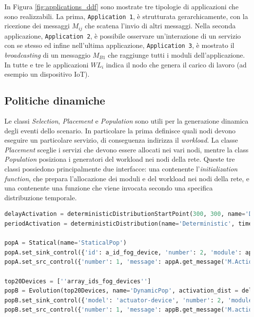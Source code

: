 In Figura \ref{fig:applications_ddf} sono mostrate tre tipologie di applicazioni che sono realizzabili. La prima, \texttt{Application 1}, è strutturata gerarchicamente, con la ricezione dei messaggi $M_{ij}$ che scatena l'invio di altri messaggi. Nella seconda applicazione, \texttt{Application 2}, è possibile osservare un'interazione di un servizio con se stesso ed infine nell'ultima applicazione, \texttt{Application 3}, è mostrato il \textit{broadcasting} di un messaggio $M_{B1}$ che raggiunge tutti i moduli dell'applicazione. In tutte e tre le applicazioni $WL_i$ indica il nodo che genera il carico di lavoro (ad esempio un dispositivo IoT).

\subsection{Politiche dinamiche}
Le classi \textit{Selection}, \textit{Placement} e \textit{Population} sono utili per la generazione dinamica degli eventi dello scenario. In particolare la prima definisce quali nodi devono eseguire un particolare servizio, di conseguenza indirizza il \textit{workload}. La classe \textit{Placement} sceglie i servizi che devono essere allocati nei vari nodi, mentre la class \textit{Population} posiziona i generatori del workload nei nodi della rete. Queste tre classi possiedono principalmente due interfacce: una contenente l'\textit{initialization function}, che prepara l'allocazione dei moduli e del workload nei nodi della rete, e una contenente una funzione che viene invocata secondo una specifica distribuzione temporale.

\begin{lstlisting}[language=python, caption={Definizione di due Population policies: una statica (\texttt{popA}) ed una dinamica (\texttt{popB}). \cite{YAFSSimulator}}, captionpos=b, label={lst:population-policy}]
delayActivation = deterministicDistributionStartPoint(300, 300, name='Deterministic')
periodActivation = deterministicDistribution(name='Deterministic', time=100)

popA = Statical(name='StaticalPop')
popA.set_sink_control({'id': a_id_fog_device, 'number': 2, 'module': appA.get_sink_modules()})
popA.set_src_control({'number': 1, 'message': appA.get_message('M.Action'), 'distribution': periodicActivation})

top20Devices = [''array_ids_fog_devices'']
popB = Evolution(top20Devices, name='DynamicPop', activation_dist = delayActivation)
popB.set_sink_control({'model': 'actuator-device', 'number': 2, 'module': appB.get_sink_control()})
popB.set_src_control({'number': 1, 'message': appB.get_message('M.action'), 'distribution': periodicActivation})

\end{lstlisting}

